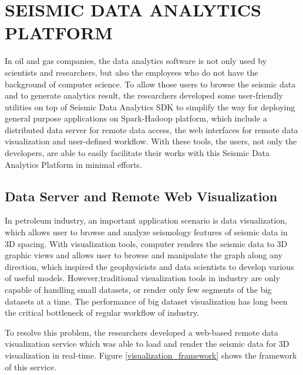 %
%
%

\chapter{\uppercase{Seismic Data Analytics Platform}}

In oil and gas companies, the data analytics software is not only used by scientists and researchers, but also the employees who do not have the background of computer science. To allow those users to browse the seismic data and to generate analytics result, the researchers developed some user-friendly utilities on top of Seismic Data Analytics SDK to simplify the way for deploying general purpose applications on Spark-Hadoop platform, which include a distributed data server for remote data access, the web interfaces for remote data visualization and user-defined workflow. With these tools, the users, not only the developers, are able to easily facilitate their works with this Seismic Data Analytics Platform in minimal efforts.


\section{Data Server and Remote Web Visualization}

In petroleum industry, an important application scenario is data visualization, which allows user to browse and analyze seismology features of seismic data in 3D spacing. With visualization tools, computer renders the seismic data to 3D graphic views and allows user to browse and manipulate the graph along any direction, which inspired the geophysicists and data scientists to develop various of useful models. However,traditional visualization tools in industry are only capable of handling small datasets, or render only few segments of the big datasets at a time. The performance of  big dataset visualization has long been the critical bottleneck of regular workflow of industry.

To resolve this problem, the researchers developed a web-based remote data visualization service which was able to load and render the seismic data for 3D visualization in real-time. Figure \ref{visualization_framework} shows the framework of this service. 

